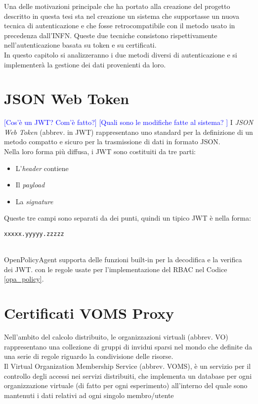 Una delle motivazioni principale che ha portato alla creazione del progetto descritto in questa tesi 
sta nel creazione un sistema che supportasse 
un nuova tecnica di autenticazione e che fosse retrocompatibile con il metodo usato in precedenza dall'INFN.  
Queste due tecniche consistono rispettivamente nell'autenticazione basata su token e su certificati.    
\\ In questo capitolo si analizzeranno i due metodi diversi di autenticazione e si implementerà la gestione 
dei dati provenienti da loro.

\section{JSON Web Token}
\textcolor{blue}{[Cos'è un JWT? Com'è fatto?]}
\textcolor{blue}{[Quali sono le modifiche fatte al sistema? ]}
I \textit{JSON Web Token} (abbrev. in JWT) rappresentano uno standard per la definizione di un metodo 
compatto e sicuro per la trasmissione di dati in formato JSON.  
\\ Nella loro forma più diffusa, i JWT sono costituiti da tre parti:
\begin{itemize}
    \item L'\textit{header} contiene   
    \item Il \textit{payload}
    \item La \textit{signature}
\end{itemize}
Queste tre campi sono separati da dei punti, quindi un tipico JWT è nella forma:
\\ \centerline{\texttt{xxxxx.yyyyy.zzzzz}}
\\
OpenPolicyAgent supporta delle funzioni built-in per la decodifica e la verifica dei JWT.
con le regole usate per l'implementazione del RBAC nel Codice \ref*{opa_policy}. 

\section{Certificati VOMS Proxy}
Nell'ambito del calcolo distribuito, le organizzazioni virtuali (abbrev. VO) rappresentano una collezione di gruppi 
di invidui sparsi nel mondo che definite da una serie di regole riguardo la condivisione delle risorse.
\\ Il Virtual Organization Membership Service (abbrev. VOMS), è un servizio per il controllo degli accessi 
nei servizi distribuiti, che implementa
un database per ogni organizzazione virtuale (di fatto per ogni esperimento) all’interno del
quale sono mantenuti i dati relativi ad ogni singolo membro/utente
